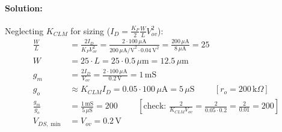 \paragraph{Solution:} Neglecting \(K_{CLM}\) for sizing
(\(I_D = \frac{K_P}{2}\frac{W}{L}V_{ov}^2\)):
\begin{align*}
  \frac{W}{L} &= \frac{2 I_D}{K_P V_{ov}^2} = \frac{2 \cdot 100\,\mu\text{A}}{200\,\mu\text{A/V}^2 \cdot 0.04\,\text{V}^2} = \frac{200\,\mu\text{A}}{8\,\mu\text{A}} = 25 \\
  W &= 25 \cdot L = 25 \cdot 0.5\,\mu\text{m} = 12.5\,\mu\text{m} \\
  g_m &= \frac{2 I_D}{V_{ov}} = \frac{2 \cdot 100\,\mu\text{A}}{0.2\,\text{V}} = 1\,\text{mS} \\
  g_o &\approx K_{CLM} I_D = 0.05 \cdot 100\,\mu\text{A} = 5\,\mu\text{S} \hspace{1cm} [r_o = 200\,\text{k}\Omega] \\
  \frac{g_m}{g_o} &= \frac{1\,\text{mS}}{5\,\mu\text{S}} = 200 \hspace{1cm} \left[\text{check: } \frac{2}{K_{CLM} V_{ov}} = \frac{2}{0.05 \cdot 0.2} = \frac{2}{0.01} = 200\right] \\
  V_{DS,\min} &= V_{ov} = 0.2\,\text{V}
\end{align*}
